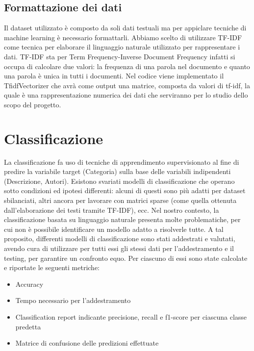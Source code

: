 \documentclass[12pt,oneside]{article}
\begin{document}
    \begin{enumerate}
    \subsection{Formattazione dei dati}
    \begin{justify}
    Il dataset utilizzato è composto da soli dati testuali ma per appiclare tecniche di machine learning è necessario formattarli. Abbiamo scelto di utilizzare TF-IDF come tecnica per elaborare il linguaggio naturale utilizzato per rappresentare i dati. TF-IDF sta per Term Frequency-Inverse Document Frequency infatti si occupa di calcolare due valori: la frequenza di una parola nel documento e quanto una parola è unica in tutti i documenti. Nel codice viene implementato il TfidfVectorizer che avrà come output una matrice, composta da valori di tf-idf, la quale è una rappresentazione numerica dei dati che serviranno per lo studio dello scopo del progetto. 
    \end{justify}
    \end{enumerate}


\section{Classificazione}
    \begin{justify}
        La classificazione fa uso di tecniche di apprendimento supervisionato al fine di predire la variabile target (Categoria) sulla base delle variabili indipendenti (Descrizione, Autori). Esistono svariati modelli di classificazione che operano sotto condizioni ed ipotesi differenti: alcuni di questi sono più adatti per dataset sbilanciati, altri ancora per lavorare con matrici sparse (come quella ottenuta dall’elaborazione dei testi tramite TF-IDF), ecc. Nel nostro contesto, la classificazione basata su linguaggio naturale presenta molte problematiche, per cui non è possibile identificare un modello adatto a risolverle tutte. A tal proposito, differenti modelli di classificazione sono stati addestrati e valutati, avendo cura di utilizzare per tutti essi gli stessi dati per l’addestramento e il testing, per garantire un confronto equo. 
        Per ciascuno di essi sono state calcolate e riportate le seguenti metriche:
        \begin{itemize}
            \item Accuracy
            \item Tempo necessario per l’addestramento
            \item Classification report indicante precisione, recall e f1-score per ciascuna classe predetta
            \item Matrice di confusione delle predizioni effettuate
        \end{itemize}
    \end{justify}
   
\end{document}
